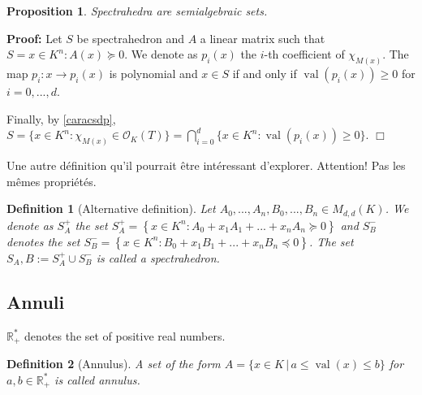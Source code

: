 \documentclass[a4paper,12pt]{article}
\newenvironment{proof}{\hbox{}\vspace{-0.8cm} {\bf Proof:}}{\hfill $\Box$}
\newtheorem{proposition}{Proposition}
\newtheorem{definition}{Definition}
\newcommand{\R}{\mathbb{R}} %
\newcommand{\corentin}[1]{{\color{red} #1}} %
\DeclareMathOperator{\val}{val}
\newcommand{\OK}{\mathcal{O}_K}
\begin{document}
\begin{proposition}
  Spectrahedra are semialgebraic sets. 
\end{proposition}

\begin{proof}
  Let $S$ be spectrahedron and $A$ a linear matrix such that $S={x \in K^n : A(x) \succeq 0}$. 
  We denote as $p_i(x)$ the $i$-th coefficient of $\chi_{M(x)}$. The map $p_i	: x \to p_i(x)$ is polynomial and $x \in S$ if and only if $\val(p_i(x)) \geq 0$ for $i=0,...,d$.
  
  Finally, by \ref{caracsdp}, $S = \{x \in K^n : \chi_{M(x)} \in \OK(T)\} = \bigcap\limits_{i=0}^d \{x \in K^n : \val(p_i(x)) \geq 0\}$.
\end{proof}

\corentin{ Une autre définition qu'il pourrait être intéressant d'explorer. Attention! Pas les mêmes propriétés.}
\begin{definition}[Alternative definition]
  Let $A_0, ..., A_n, B_0, ..., B_n \in M_{d,d}(K)$. 
  We denote as $S^+_A$ the set $S_{A}^+ = \left\{ x \in K^n : A_0 + x_1 A_1+ ...+x_nA_n \succeq 0  \right\}$ and $S^-_B$ denotes the set $S^-_B = \left\{ x \in K^n : B_0 + x_1 B_1+ ...+x_nB_n \preceq 0\right\}$. 
  The set $S_A,B := S_A^+ \cup S_B^-$ is called a \emph{spectrahedron}.
\end{definition}

\subsection{Annuli}

$\R^*_+$ denotes the set of positive real numbers.

\begin{definition}[Annulus]\label{def_annuli}
  A set of the form $A = \{x \in K \,|\, a \le \val(x) \le b\}$ for $a,b \in \R^*_+$ is called \emph{annulus}.
\end{definition}
\end{document}
